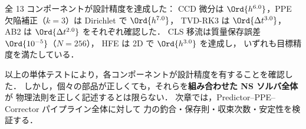 \begin{tcolorbox}[resultbox, title={コンポーネント検証の総括}]
全 13 コンポーネントが設計精度を達成した：
CCD 微分は $\Ord{h^{6.0}}$，PPE 欠陥補正（$k{=}3$）は Dirichlet で $\Ord{h^{7.0}}$，
TVD-RK3 は $\Ord{\Delta t^{3.0}}$，AB2 は $\Ord{\Delta t^{2.0}}$ をそれぞれ確認した．
CLS 移流は質量保存誤差 $\Ord{10^{-5}}$（$N{=}256$），
HFE は 2D で $\Ord{h^{3.0}}$ を達成し，
いずれも目標精度を満たしている．
\end{tcolorbox}

\noindent
以上の単体テストにより，各コンポーネントが設計精度を有することを確認した．
しかし，個々の部品が正しくても，それらを\textbf{組み合わせた NS ソルバ全体}が
物理法則を正しく記述するとは限らない．
次章では，Predictor--PPE--Corrector パイプライン全体に対して
力の釣合・保存則・収束次数・安定性を検証する．
